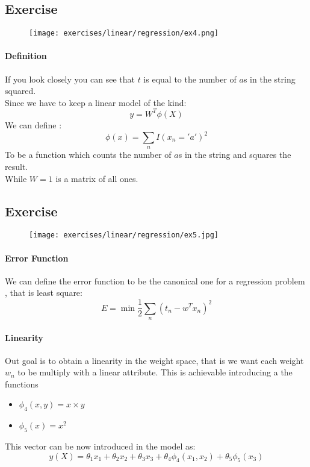 \subsection{Exercise }

\begin{figure}[H]
    \centering
    \texttt{[image: exercises/linear/regression/ex4.png]}
\end{figure}

\paragraph{Definition}
If you look closely you can see that $t$ is equal to the number of $a$s in the string squared.\\
Since we have to keep a linear model of the kind:
$$y=W^T\phi(X) $$ 
We can define :
$$\phi(x)=\sum_n I(x_n='a')^2$$
To be a function which counts the number of $a$s in the string and squares the result.\\
While $W=1$ is a matrix of all ones.


\subsection{Exercise}

\begin{figure}[H]
    \centering
    \texttt{[image: exercises/linear/regression/ex5.jpg]}
\end{figure}

\paragraph{Error Function }
We can define the error function to be the canonical one for a regression problem , that is least square:
$$E=\min\frac{1}{2}\sum_n (t_n -w^Tx_n)^2$$

\paragraph{Linearity}
Out goal is to obtain a linearity in the weight space, that is we want each weight $w_n$ to be multiply with a linear attribute. This is achievable introducing a the functions
\begin{itemize}
\item $\phi_4(x,y)=x\times y$
\item $\phi_5(x)=x^2$
\end{itemize}
This vector can be now introduced in the model as:
$$y(X)=\theta_1 x_1+ \theta_2 x_2+\theta_3 x_3+ \theta_4 \phi_4(x_1,x_2)+\theta_5\phi_5(x_3)$$


